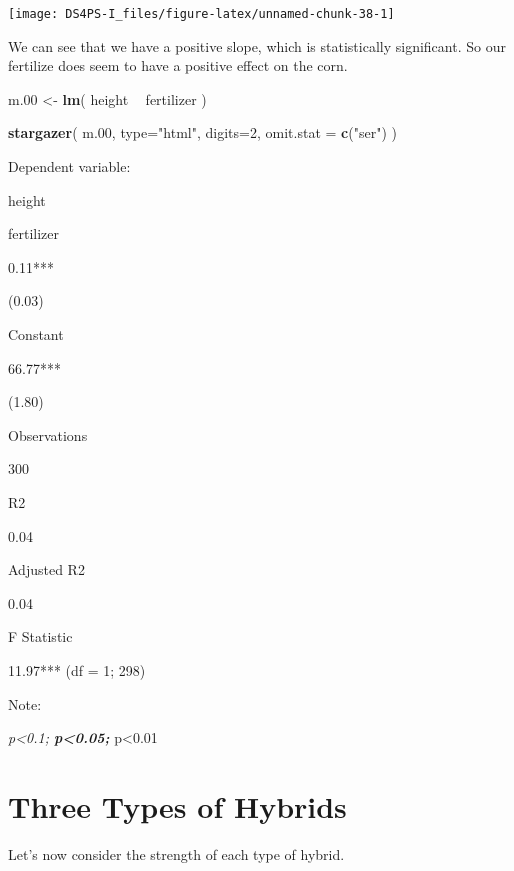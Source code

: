 \documentclass[]{book}
\newenvironment{Shaded}{\begin{snugshade}}{\end{snugshade}}
\newcommand{\DataTypeTok}[1]{\textcolor[rgb]{0.13,0.29,0.53}{#1}}
\newcommand{\DecValTok}[1]{\textcolor[rgb]{0.00,0.00,0.81}{#1}}
\newcommand{\FloatTok}[1]{\textcolor[rgb]{0.00,0.00,0.81}{#1}}
\newcommand{\KeywordTok}[1]{\textcolor[rgb]{0.13,0.29,0.53}{\textbf{#1}}}
\newcommand{\NormalTok}[1]{#1}
\newcommand{\OperatorTok}[1]{\textcolor[rgb]{0.81,0.36,0.00}{\textbf{#1}}}
\newcommand{\StringTok}[1]{\textcolor[rgb]{0.31,0.60,0.02}{#1}}
\theoremstyle{definition}
\theoremstyle{definition}
\theoremstyle{definition}
\theoremstyle{remark}
\begin{document}
\begin{center}\texttt{[image: DS4PS-I\_files/figure-latex/unnamed-chunk-38-1]} \end{center}

We can see that we have a positive slope, which is statistically
significant. So our fertilize does seem to have a positive effect on the
corn.

\begin{Shaded}
\begin{Highlighting}[]


\NormalTok{m}\FloatTok{.00}\NormalTok{ <-}\StringTok{ }\KeywordTok{lm}\NormalTok{( height }\OperatorTok{~}\StringTok{ }\NormalTok{fertilizer )}


\KeywordTok{stargazer}\NormalTok{( m}\FloatTok{.00}\NormalTok{, }\DataTypeTok{type=}\StringTok{"html"}\NormalTok{, }
           \DataTypeTok{digits=}\DecValTok{2}\NormalTok{, }\DataTypeTok{omit.stat =} \KeywordTok{c}\NormalTok{(}\StringTok{"ser"}\NormalTok{) )}
\end{Highlighting}
\end{Shaded}

Dependent variable:

height

fertilizer

0.11***

(0.03)

Constant

66.77***

(1.80)

Observations

300

R2

0.04

Adjusted R2

0.04

F Statistic

11.97*** (df = 1; 298)

Note:

\emph{p\textless{}0.1; \textbf{p\textless{}0.05; }}p\textless{}0.01

\hypertarget{three-types-of-hybrids}{%
\section{Three Types of Hybrids}\label{three-types-of-hybrids}}

Let's now consider the strength of each type of hybrid.
\end{document}
